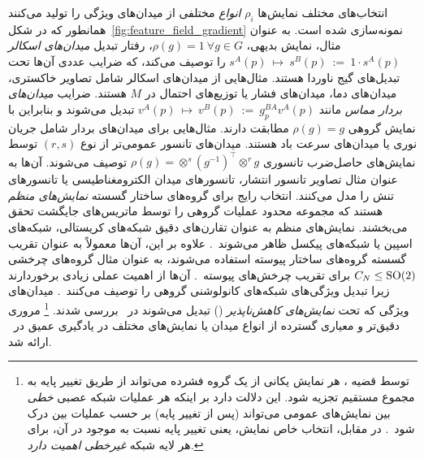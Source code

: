 				
				انتخاب‌های مختلف نمایش‌ها $\rho_i$ \emph{انواع} مختلفی از میدان‌های ویژگی را تولید می‌کنند همانطور که در شکل~\ref{fig:feature_field_gradient} نمونه‌سازی شده است.
				به عنوان مثال، نمایش بدیهی، $\rho(g)=1\ \forall g\in G$، رفتار تبدیل \emph{میدان‌های اسکالر} $s^A(p)\ \mapsto\ s^B(p)\ :=\ 1\cdot s^A(p)$ را توصیف می‌کند، که ضرایب عددی آن‌ها تحت تبدیل‌های گیج ناوردا هستند.
				مثال‌هایی از میدان‌های اسکالر شامل تصاویر خاکستری، میدان‌های دما، میدان‌های فشار یا توزیع‌های احتمال در $M$ هستند.
				ضرایب \emph{میدان‌های بردار مماس} مانند $v^A(p)\ \mapsto\ v^B(p)\ :=\ g_p^{BA}v^A(p)$ تبدیل می‌شوند و بنابراین با نمایش گروهی $\rho(g)=g$ مطابقت دارند.
				مثال‌هایی برای میدان‌های بردار شامل جریان نوری یا میدان‌های سرعت باد هستند.
				میدان‌های تانسور عمومی‌تر از نوع $(r,s)$ توسط نمایش‌های حاصل‌ضرب تانسوری $\rho(g) = \otimes^s\left(g^{-1}\right)^{\!\top} \otimes^r g$ توصیف می‌شوند.
				آن‌ها به عنوان مثال تصاویر تانسور انتشار، تانسورهای میدان الکترومغناطیسی یا تانسورهای تنش را مدل می‌کنند.
				انتخاب رایج برای گروه‌های ساختار گسسته \emph{نمایش‌های منظم} هستند که مجموعه محدود عملیات گروهی را توسط ماتریس‌های جایگشت تحقق می‌بخشند.
				نمایش‌های منظم به عنوان تقارن‌های دقیق شبکه‌های کریستالی، شبکه‌های اسپین یا شبکه‌های پیکسل ظاهر می‌شوند~\cite{Cohen2016-GCNN,Hoogeboom2018-HEX,winkels3DGCNNsPulmonary2018,Worrall2018-CUBENET,gaugeIco2019}.
				علاوه بر این، آن‌ها معمولاً به عنوان تقریب گسسته گروه‌های ساختار پیوسته استفاده می‌شوند، به عنوان مثال گروه‌های چرخشی $C_N\leq\operatorname{SO}(2)$ برای تقریب چرخش‌های پیوسته~\cite{Weiler2018SFCNN,bekkers2018roto,Weiler2019_E2CNN,bekkers2020bspline,Marcos2017-VFN}.
				آن‌ها از اهمیت عملی زیادی برخوردارند زیرا تبدیل ویژگی‌های شبکه‌های کانولوشنی گروهی را توصیف می‌کنند~\cite{Cohen2016-GCNN}.
				میدان‌های ویژگی که تحت \emph{نمایش‌های کاهش‌ناپذیر} () تبدیل می‌شوند در~\cite{Worrall2017-HNET,3d_steerableCNNs,Thomas2018-TFN,Kondor2018-NBN,anderson2019cormorant,Weiler2019_E2CNN,jiang2019spherical} بررسی شدند.%
				\footnote{
					\label{footnote:feature_field_irrep_decomposition}
					توسط قضیه ، هر نمایش یکانی از یک گروه فشرده می‌تواند از طریق تغییر پایه به مجموع مستقیم  تجزیه شود.
					این دلالت دارد بر اینکه هر عملیات شبکه عصبی \emph{خطی} بین نمایش‌های عمومی می‌تواند (پس از تغییر پایه) بر حسب عملیات بین  درک شود~\cite{Weiler2019_E2CNN,lang2020WignerEckart}.
					در مقابل، انتخاب خاص نمایش، یعنی تغییر پایه نسبت به  موجود در آن، برای هر لایه شبکه \emph{غیرخطی} \emph{اهمیت دارد}.
				}
				مروری دقیق‌تر و معیاری گسترده از انواع میدان یا نمایش‌های مختلف در یادگیری عمیق در~\cite{Weiler2019_E2CNN} ارائه شد.
				
